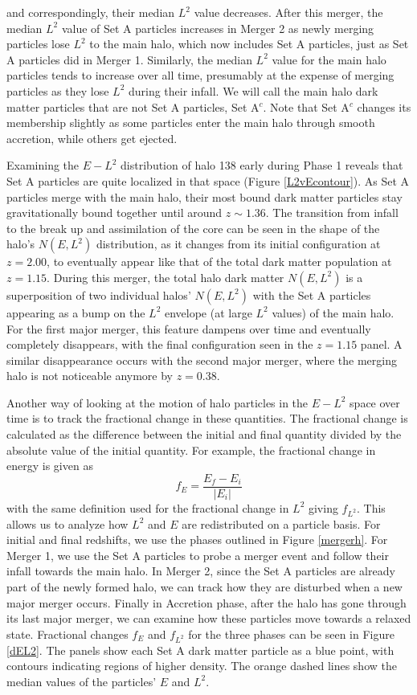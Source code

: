 \documentclass[a4paper,11pt]{article}
\begin{document}
\noindent
and correspondingly, their median $L^2$ value decreases.  After this merger, the median $L^2$ 
value of Set A particles increases in Merger 2 as newly merging particles lose $L^2$ to the main halo, which now includes Set A particles, just as Set A particles did in Merger 1.  
Similarly, the median $L^2$ value for the main halo particles tends to increase over all time, presumably at the expense of merging particles as they 
lose $L^2$ during their infall.  We will call the main halo dark matter particles that are not Set A particles, Set A$^c$.  Note that Set 
A$^c$ changes its membership slightly as some particles enter the main halo through smooth accretion, while others get ejected.

Examining the $E-L^2$ distribution of halo 138 early during Phase 
1 reveals that Set A particles are quite localized in that space (Figure \ref{L2vEcontour}).  As Set A particles merge with the main halo, their most bound dark matter particles 
stay gravitationally bound together until around $z\sim1.36$. The transition from infall to the break up and assimilation of 
the core can be seen in the shape of the halo's $N(E,L^2)$ distribution, as it changes from its initial configuration at $z=2.00$, to eventually appear 
like that of the total dark matter population at $z=1.15$.  During this merger, the total halo dark matter $N(E,L^2)$ is a 
superposition of two individual halos' $N(E,L^2)$ with the Set A particles appearing as a bump on the $L^2$ envelope (at large $L^2$ values) of the main 
halo.  For the first major merger, this feature dampens over time and eventually completely disappears, with the final configuration seen in the $z=1.15$ 
panel.  A similar disappearance occurs with the second major merger, where the merging halo is not noticeable anymore by $z=0.38$. 

Another way of looking at the motion of halo particles in the $E-L^2$ space over time is to track the fractional change in these quantities.  The 
fractional change is calculated as the difference between the initial and final quantity divided by the absolute value of the initial quantity. For example, 
the fractional change in energy is given as
\begin{equation}
 f_E=\dfrac{E_f-E_i}{|E_i|}
\end{equation}
with the same definition used for the fractional change in $L^2$ giving $f_{L^2}$.  This allows us to analyze how $L^2$ and $E$ are redistributed on a particle basis. For initial 
and final redshifts, we use the phases 
outlined in Figure \ref{mergerh}. For Merger 1, we use the Set A particles to probe a merger event and follow their infall towards the main halo.  In Merger 2, since the 
Set A particles are already part of the newly formed halo, we can track how they are disturbed when a new major merger occurs.  Finally in Accretion phase, after the halo 
has gone through its last major merger, we can examine how these particles move towards a relaxed state.  Fractional changes $f_E$ and $f_{L^2}$ for 
the three phases can be seen in Figure \ref{dEL2}.  The panels show each Set A dark matter particle 
as a blue point, with contours indicating regions of higher density. The orange dashed lines show the median values of the particles' $E$ and $L^2$.  
\end{document}

